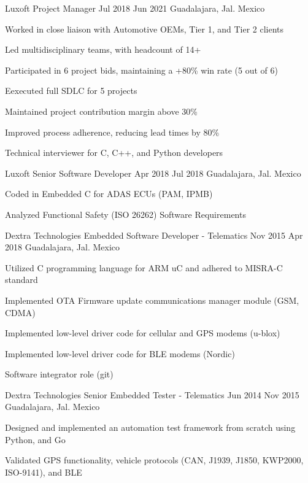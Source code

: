 \job
    {Luxoft}
    {Project Manager}
    {Jul 2018}
    {Jun 2021}
    {Guadalajara, Jal. Mexico}
    {
        \begin{itemize-bullets}
            \item{Worked in close liaison with Automotive OEMs, Tier 1, and Tier 2 clients}
            \item{Led multidisciplinary teams, with headcount of 14+}
            \item{Participated in 6 project bids, maintaining a +80\% win rate (5 out of 6)}
            \item{Eexecuted full SDLC for 5 projects}
            \item{Maintained project contribution margin above 30\% }
            \item{Improved process adherence, reducing lead times by 80\%}
            \item{Technical interviewer for C, C++, and Python developers}
        \end{itemize-bullets}
    }

\job
    {Luxoft}
    {Senior Software Developer}
    {Apr 2018}
    {Jul 2018}
    {Guadalajara, Jal. Mexico}
    {
        \begin{itemize-bullets}
            \item{Coded in Embedded C for ADAS ECUs (PAM, IPMB)}
            \item{Analyzed Functional Safety (ISO 26262) Software Requirements}
        \end{itemize-bullets}
    }

\job
    {Dextra Technologies}
    {Embedded Software Developer - Telematics}
    {Nov 2015}
    {Apr 2018}
    {Guadalajara, Jal. Mexico}
    {
        \begin{itemize-bullets}
            \item{Utilized C programming language for ARM uC and adhered to MISRA-C standard}
            \item{Implemented OTA Firmware update communications manager module (GSM, CDMA)}
            \item{Implemented low-level driver code for cellular and GPS modems (u-blox)}
            \item{Implemented low-level driver code for BLE modems (Nordic)}
            \item{Software integrator role (git)}
        \end{itemize-bullets}
    }

\job
    {Dextra Technologies}
    {Senior Embedded Tester - Telematics}
    {Jun 2014}
    {Nov 2015}
    {Guadalajara, Jal. Mexico}
    {
        \begin{itemize-bullets}
            \item{Designed and implemented an automation test framework from scratch using Python, and Go}
            \item{Validated GPS functionality, vehicle protocols (CAN, J1939, J1850, KWP2000, ISO-9141), and BLE}
        \end{itemize-bullets}
    }


